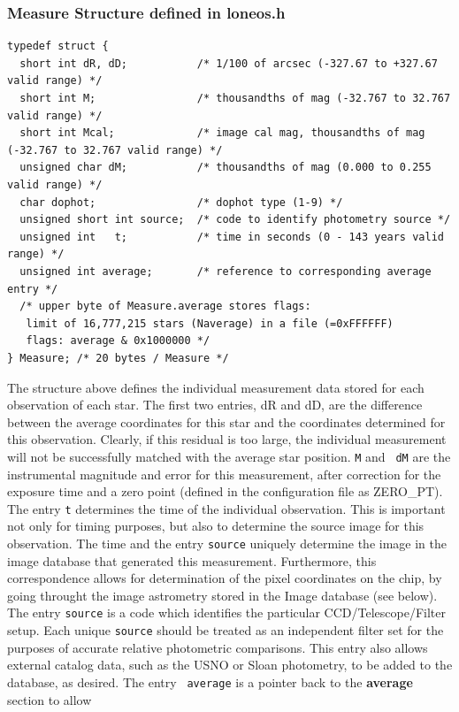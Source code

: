 \documentclass{article}
\begin{document}
\subsubsection*{Measure Structure defined in loneos.h}
{\footnotesize
\begin{verbatim}
typedef struct {
  short int dR, dD;           /* 1/100 of arcsec (-327.67 to +327.67 valid range) */
  short int M;                /* thousandths of mag (-32.767 to 32.767 valid range) */
  short int Mcal;             /* image cal mag, thousandths of mag (-32.767 to 32.767 valid range) */
  unsigned char dM;           /* thousandths of mag (0.000 to 0.255 valid range) */
  char dophot;                /* dophot type (1-9) */
  unsigned short int source;  /* code to identify photometry source */
  unsigned int   t;           /* time in seconds (0 - 143 years valid range) */
  unsigned int average;       /* reference to corresponding average entry */
  /* upper byte of Measure.average stores flags:
   limit of 16,777,215 stars (Naverage) in a file (=0xFFFFFF) 
   flags: average & 0x1000000 */
} Measure; /* 20 bytes / Measure */
\end{verbatim} }
The structure above defines the individual measurement data stored for
each observation of each star.  The first two entries, dR and dD, are
the difference between the average coordinates for this star and the
coordinates determined for this observation.  Clearly, if this
residual is too large, the individual measurement will not be
successfully matched with the average star position.  {\tt M} and {\tt
  dM} are the instrumental magnitude and error for this measurement,
after correction for the exposure time and a zero point (defined in
the configuration file as ZERO\_PT).  The entry {\tt t} determines the
time of the individual observation.  This is important not only for
timing purposes, but also to determine the source image for this
observation.  The time and the entry {\tt source} uniquely determine
the image in the image database that generated this measurement.
Furthermore, this correspondence allows for determination of the pixel
coordinates on the chip, by going throught the image astrometry stored
in the Image database (see below).  The entry {\tt source} is a code which
identifies the particular CCD/Telescope/Filter setup.  Each unique
{\tt source} should be treated as an independent filter set for the
purposes of accurate relative photometric comparisons.  This entry
also allows external catalog data, such as the USNO or Sloan
photometry, to be added to the database, as desired.  The entry {\tt
  average} is a pointer back to the {\bf average} section to allow
\end{document}
